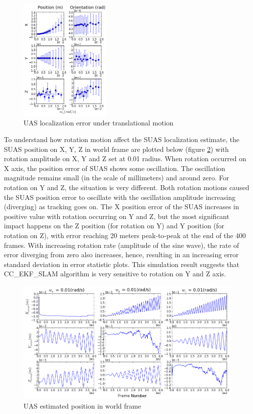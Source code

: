 \begin{figure}[h]
  \includegraphics[width=4.5cm, keepaspectratio=true]{./Figures/SimulationFigures/Figure13.png}
  \caption{UAS localization error under translational 
  \label{fig:simfig9-10}
    motion}
\end{figure}

To understand how rotation motion affect the SUAS localization
estimate, the SUAS position on X, Y, Z in world frame are plotted
below (figure \ref{fig:simfig14}) with rotation amplitude on X, Y and
Z set at 0.01 radius. When rotation occurred on X axis, the position
error of SUAS shows some oscillation. The oscillation magnitude
remains small (in the scale of millimeters) and around zero. For
rotation on Y and Z, the situation is very different. Both rotation
motions caused the SUAS position error to oscillate with the
oscillation amplitude increasing (diverging) as tracking goes on. The
X position error of the SUAS increases in positive value with rotation
occurring on Y and Z, but the most significant impact happens on the Z
position (for rotation on Y) and Y position (for rotation on Z), with
error reaching 20 meters peak-to-peak at the end of the 400 frames.
With increasing rotation rate (amplitude of the sine wave), the rate of
error diverging from zero also increases, hence, resulting in an
increasing error standard deviation in error statistic plots. This
simulation result suggests that CC\_EKF\_SLAM algorithm is very
sensitive to rotation on Y and Z axis.

\begin{figure}[h]
  \centering
  \includegraphics[width=13cm, keepaspectratio=true]{./Figures/SimulationFigures/Figure14.png}
  \caption{UAS estimated position in world frame}
  \label{fig:simfig14}
\end{figure}
\FloatBarrier
